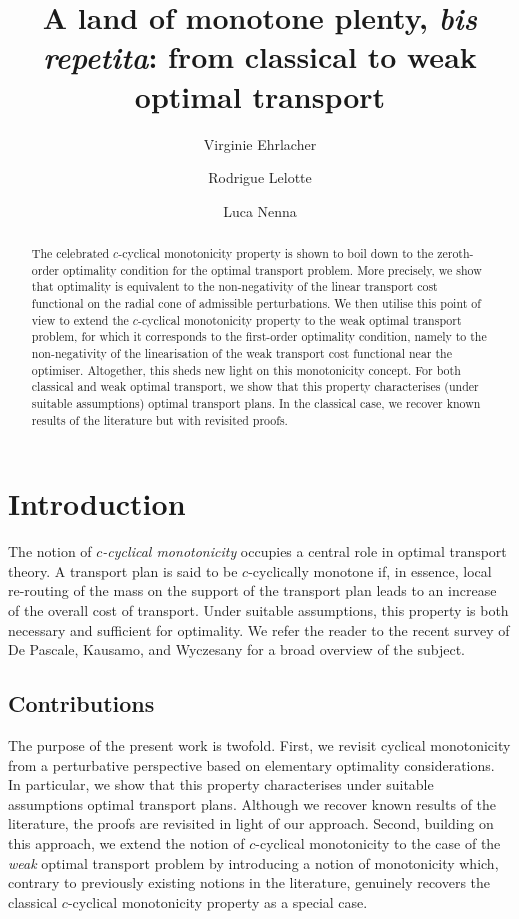 \documentclass[leqno, 11pt, a4paper]{amsart}
\title[A land of monotone plenty, \textit{bis repetita}]{A land of monotone plenty, \textit{bis repetita}: from classical to weak optimal transport}
\author{Virginie Ehrlacher}
\author{Rodrigue Lelotte}
\author{Luca Nenna}
\theoremstyle{definition}
\begin{document}
	
\maketitle

\begin{abstract}
The celebrated $c$-cyclical monotonicity property is shown to boil down to the zeroth-order optimality condition for the optimal transport problem. More precisely, we show that optimality is equivalent to the non-negativity of the linear transport cost functional on the radial cone of admissible perturbations. We then utilise this point of view to extend the $c$-cyclical monotonicity property to the weak optimal transport problem, for which it corresponds to the first-order optimality condition, namely to the non-negativity of the linearisation of the weak transport cost functional near the optimiser. Altogether, this sheds new light on this monotonicity concept. For both  classical and weak optimal transport, we show that this property characterises (under suitable assumptions) optimal transport plans. In the classical case, we recover known results of the literature but with revisited proofs.   
\end{abstract}

\setcounter{tocdepth}{2}
\tableofcontents

\section{Introduction}

The notion of \textit{$c$-cyclical monotonicity} occupies a central role in optimal transport theory. A transport plan is said to be $c$-cyclically monotone if, in essence, local re-routing of the mass on the support of the transport plan leads to an increase of the overall cost of transport. Under suitable assumptions, this property is both necessary and sufficient for optimality. We refer the reader to the recent survey of De Pascale, Kausamo, and Wyczesany \cite{depascale60YearsCyclic2025} for a broad overview of the subject.

\subsection{Contributions} 
The purpose of the present work is twofold. First, we revisit cyclical monotonicity from a perturbative perspective based on elementary optimality considerations. In particular, we show that this property characterises under suitable assumptions optimal transport plans. Although we recover known results of the literature, the proofs are revisited in light of our approach. Second, building on this approach, we extend the notion of $c$-cyclical monotonicity to the case of the \textit{weak} optimal transport problem by introducing a notion of monotonicity which, contrary to previously existing notions in the literature, genuinely recovers the classical $c$-cyclical monotonicity property as a special case. 
\end{document}
